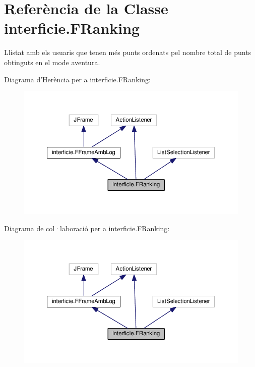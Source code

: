 \hypertarget{classinterficie_1_1_f_ranking}{\section{Referència de la Classe interficie.\+F\+Ranking}
\label{classinterficie_1_1_f_ranking}
}


Llistat amb els usuaris que tenen més punts ordenats pel nombre total de punts obtinguts en el mode aventura.  




Diagrama d'Herència per a interficie.\+F\+Ranking\+:\nopagebreak
\begin{figure}[H]
\begin{center}
\leavevmode
\includegraphics[width=350pt]{classinterficie_1_1_f_ranking__inherit__graph}
\end{center}
\end{figure}


Diagrama de col·laboració per a interficie.\+F\+Ranking\+:\nopagebreak
\begin{figure}[H]
\begin{center}
\leavevmode
\includegraphics[width=350pt]{classinterficie_1_1_f_ranking__coll__graph}
\end{center}
\end{figure}
